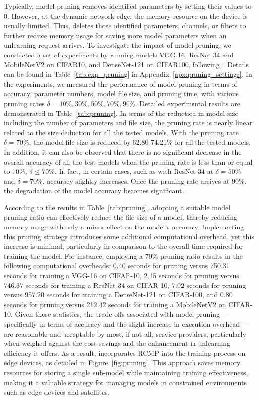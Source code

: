 \documentclass[conference,compsoc]{IEEEtran}
\begin{document}
Typically, model pruning removes identified parameters by setting their values to 0. However, at the dynamic network edge, the memory resource on the device is usually limited. Thus, \tool deletes those identified parameters, channels, or filters to further reduce memory usage for saving more model parameters when an unlearning request arrives. To investigate the impact of model pruning, we conducted a set of experiments by running models VGG-16, ResNet-34 and MobileNetV2 on CIFAR10, and DenseNet-121 on CIFAR100, following~\cite{chen2021chasing,zhu2021vision}. Details can be found in Table~\ref{tab:exp_pruning} in Appendix~\ref{apx:pruning_settings}. In the experiments, we measured the performance of model pruning in terms of accuracy, parameter numbers, model file size, and pruning time, with various pruning rates $\delta = 10\%, 30\%, 50\%, 70\%, 90\%$. Detailed experimental results are demonstrated in Table~\ref{tab:pruning}. In terms of the reduction in model size including the number of parameters and file size, the pruning rate is nearly linear related to the size deduction for all the tested models. With the pruning rate $\delta = 70\%$, the model file size is reduced by 62.80-74.21\% for all the tested models. 
In addition, it can also be observed that there is no significant decrease in the overall accuracy of all the test models when the pruning rate is less than or equal to 70\%, \ie $\delta \leq 70\%$. In fact, in certain cases, such as with ResNet-34 at $\delta=50\%$ and $\delta=70\%$, accuracy slightly increases. Once the pruning rate arrives at 90\%, the degradation of the model accuracy becomes significant. 

According to the results in Table~\ref{tab:pruning}, adopting a suitable model pruning ratio can effectively reduce the file size of a model, thereby reducing memory usage with only a minor effect on the model's accuracy. Implementing this pruning strategy introduces some additional computational overhead, yet this increase is minimal, particularly in comparison to the overall time required for training the model. For instance, employing a 70\% pruning ratio results in the following computational overheads: 0.40 seconds for pruning versus 750.31 seconds for training a VGG-16 on CIFAR-10, 2.15 seconds for pruning versus 746.37 seconds for training a ResNet-34 on CIFAR-10, 7.02 seconds for pruning versus 957.20 seconds for training a DenseNet-121 on CIFAR-100, and 0.80 seconds for pruning versus 212.42 seconds for training a MobileNetV2 on CIFAR-10.
Given these statistics, the trade-offs associated with model pruning --- specifically in terms of accuracy and the slight increase in execution overhead --- are reasonable and acceptable by most, if not all, service providers, particularly when weighed against the cost savings and the enhancement in unlearning efficiency it offers. As a result, \tool incorporates RCMP into the training process on edge devices, as detailed in Figure~\ref{fig:pruning}. This approach saves memory resources for storing a single sub-model while maintaining training effectiveness, making it a valuable strategy for managing models in constrained environments such as edge devices and satellites.
\end{document}
